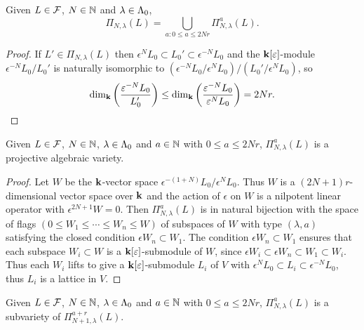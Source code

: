 \documentclass[a4paper, 11pt]{report}
\begin{document}
\begin{lemma}
Given $L\in\mathcal{F}$, $N\in\mathbb{N}$ and $\lambda\in{\Lambda_0}$,
\begin{equation*}
\Pi_{N,\lambda}(L) = \bigcup_{a:0\le a\le 2Nr} \Pi_{N,\lambda}^a(L).
\end{equation*}
\end{lemma}

\begin{proof}
If $L'\in\Pi_{N,\lambda}(L)$ then $\epsilon^N L_0\subset L_0'\subset\epsilon^{-N} L_0$ and the $\mathbf{k}[\varepsilon]$-module $\epsilon^{-N} L_0/{L_0'}$ is naturally isomorphic to $(\epsilon^{-N}L_0/{\epsilon^N L_0})/{(L_0'/{\epsilon^N L_0})}$, so
\begin{equation*}
\dim_{\mathbf{k}}\left(\frac{\varepsilon^{-N}L_0}{L_0'}\right) \le \dim_{\mathbf{k}}\left(\frac{\varepsilon^{-N}L_0}{\varepsilon^N L_0}\right) = 2Nr.
\end{equation*}
\end{proof}

\begin{lemma}
Given $L\in\mathcal{F}$, $N\in\mathbb{N}$, $\lambda\in{\Lambda_0}$ and $a\in\mathbb{N}$ with $0\le a\le 2Nr$, $\Pi_{N,\lambda}^a(L)$ is a projective algebraic variety.
\end{lemma}

\begin{proof}
Let $W$ be the $\mathbf{k}$-vector space $\epsilon^{-(1+N)}L_0/{\epsilon^N L_0}$. Thus $W$ is a $(2N+1)r$-dimensional vector space over $\mathbf{k}$ and the action of $\epsilon$ on $W$ is a nilpotent linear operator with $\epsilon^{2N+1}W = 0$. Then $\Pi_{N,\lambda}^a(L)$ is in natural bijection with the space of flags $(0\le W_1\le\cdots\le W_n\le W)$ of subspaces of $W$ with type $(\lambda,a)$ satisfying the closed condition $\epsilon W_n\subset W_1$. The condition $\epsilon W_n\subset W_1$ ensures that each subspace $W_i\subset W$ is a $\mathbf{k}[\varepsilon]$-submodule of $W$, since $\epsilon W_i\subset\epsilon W_n\subset W_1\subset W_i$. Thus each $W_i$ lifts to give a $\mathbf{k}[\varepsilon]$-submodule $L_i$ of $V$ with $\epsilon^N L_0 \subset L_i\subset \epsilon^{-N}L_0$, thus $L_i$ is a lattice in $V$.
\end{proof}

\begin{lemma}
Given $L\in\mathcal{F}$, $N\in\mathbb{N}$, $\lambda\in{\Lambda_0}$ and $a\in\mathbb{N}$ with $0\le a\le 2Nr$, $\Pi_{N,\lambda}^a(L)$ is a subvariety of $\Pi_{N+1,\lambda}^{a+r}(L)$.
\end{lemma}
\end{document}
